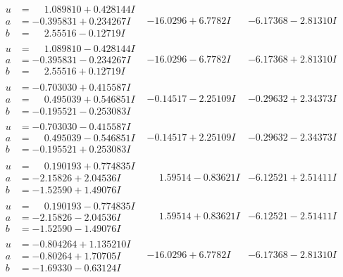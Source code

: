 \documentclass[1p]{elsarticle_modified}
\theoremstyle{definition}
\begin{document}
$$\begin{array}{c|c|c}
\begin{aligned}
u &= \phantom{-}1.089810 + 0.428144 I \\
a &= -0.395831 + 0.234267 I \\
b &= \phantom{-}2.55516 - 0.12719 I\end{aligned}
 & -16.0296 + 6.7782 I & -6.17368 - 2.81310 I \\ \hline\begin{aligned}
u &= \phantom{-}1.089810 - 0.428144 I \\
a &= -0.395831 - 0.234267 I \\
b &= \phantom{-}2.55516 + 0.12719 I\end{aligned}
 & -16.0296 - 6.7782 I & -6.17368 + 2.81310 I \\ \hline\begin{aligned}
u &= -0.703030 + 0.415587 I \\
a &= \phantom{-}0.495039 + 0.546851 I \\
b &= -0.195521 - 0.253083 I\end{aligned}
 & -0.14517 - 2.25109 I & -0.29632 + 2.34373 I \\ \hline\begin{aligned}
u &= -0.703030 - 0.415587 I \\
a &= \phantom{-}0.495039 - 0.546851 I \\
b &= -0.195521 + 0.253083 I\end{aligned}
 & -0.14517 + 2.25109 I & -0.29632 - 2.34373 I \\ \hline\begin{aligned}
u &= \phantom{-}0.190193 + 0.774835 I \\
a &= -2.15826 + 2.04536 I \\
b &= -1.52590 + 1.49076 I\end{aligned}
 & \phantom{-}1.59514 - 0.83621 I & -6.12521 + 2.51411 I \\ \hline\begin{aligned}
u &= \phantom{-}0.190193 - 0.774835 I \\
a &= -2.15826 - 2.04536 I \\
b &= -1.52590 - 1.49076 I\end{aligned}
 & \phantom{-}1.59514 + 0.83621 I & -6.12521 - 2.51411 I \\ \hline\begin{aligned}
u &= -0.804264 + 1.135210 I \\
a &= -0.80264 + 1.70705 I \\
b &= -1.69330 - 0.63124 I\end{aligned}
 & -16.0296 + 6.7782 I & -6.17368 - 2.81310 I \\ \hline\begin{aligned}

\end{aligned}
\end{array}$$
\end{document}

